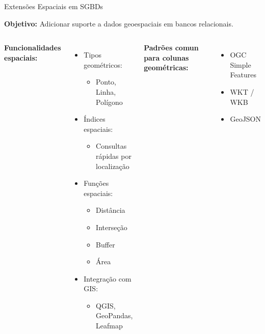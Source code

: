 \documentclass{beamer}
\begin{document}
\begin{frame}{Extensões Espaciais em SGBDs}

\textbf{Objetivo:}
Adicionar suporte a dados geoespaciais em bancos relacionais.

\vspace{0.3cm}

    \begin{columns}[t]
    \textbf{Funcionalidades espaciais:}
    \begin{itemize}
        \item Tipos geométricos:
        \begin{itemize}
            \item Ponto, Linha, Polígono
        \end{itemize}
    
        \item Índices espaciais:
        \begin{itemize}
            \item Consultas rápidas por localização
        \end{itemize}
    
        \item Funções espaciais:
        \begin{itemize}
            \item Distância
            \item Interseção
            \item Buffer
            \item Área
        \end{itemize}
    
        \item Integração com GIS:
        \begin{itemize}
            \item QGIS, GeoPandas, Leafmap
        \end{itemize}
    \end{itemize}
    \textbf{Padrões comun para colunas geométricas:}
    \begin{itemize}
        \item OGC Simple Features
        \item WKT / WKB
        \item GeoJSON
    \end{itemize}
    \end{columns}
\end{frame}
\end{document}
